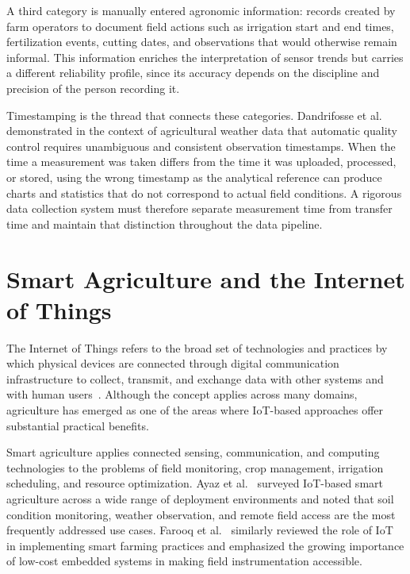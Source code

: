 A third category is manually entered agronomic information: records created by
farm operators to document field actions such as irrigation start and end times,
fertilization events, cutting dates, and observations that would otherwise remain
informal. This information enriches the interpretation of sensor trends but
carries a different reliability profile, since its accuracy depends on the
discipline and precision of the person recording it.

Timestamping is the thread that connects these categories. Dandrifosse et
al.~\cite{dandrifosse2024weather_qc_agriculture} demonstrated in the context of
agricultural weather data that automatic quality control requires unambiguous and
consistent observation timestamps. When the time a measurement was taken differs
from the time it was uploaded, processed, or stored, using the wrong timestamp as
the analytical reference can produce charts and statistics that do not correspond
to actual field conditions. A rigorous data collection system must therefore
separate measurement time from transfer time and maintain that distinction
throughout the data pipeline.

\section{Smart Agriculture and the Internet of Things}
\label{sec:smart-agriculture-iot}

The Internet of Things refers to the broad set of technologies and practices by
which physical devices are connected through digital communication infrastructure
to collect, transmit, and exchange data with other systems and with human
users~\cite{gubbi2013iot_vision}. Although the concept applies across many
domains, agriculture has emerged as one of the areas where IoT-based approaches
offer substantial practical benefits.

Smart agriculture applies connected sensing, communication, and computing
technologies to the problems of field monitoring, crop management, irrigation
scheduling, and resource optimization. Ayaz et al.~\cite{ayaz2019iot_smart_agriculture_survey}
surveyed IoT-based smart agriculture across a wide range of deployment
environments and noted that soil condition monitoring, weather observation, and
remote field access are the most frequently addressed use cases. Farooq et
al.~\cite{farooq2019iot_smart_agriculture_review} similarly reviewed the role of
IoT in implementing smart farming practices and emphasized the growing importance
of low-cost embedded systems in making field instrumentation accessible.

